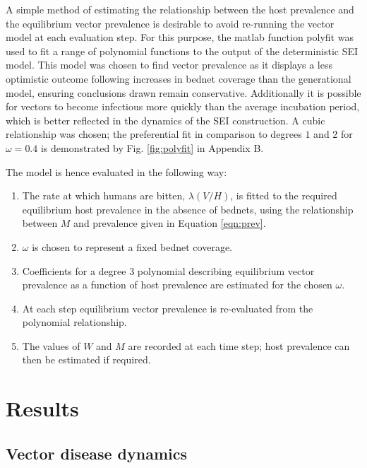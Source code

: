 \documentclass[5p,times]{elsarticle}
\begin{document}
A simple method of estimating the relationship between the host prevalence and the equilibrium vector prevalence is desirable to avoid re-running the vector model at each evaluation step. For this purpose, the matlab function polyfit was used to fit a range of polynomial functions to the output of the deterministic SEI model. This model was chosen to find vector prevalence as it displays a less optimistic outcome following increases in bednet coverage than the generational model, ensuring conclusions drawn remain conservative. Additionally it is possible for vectors to become infectious more quickly than the average incubation period, which is better reflected in the dynamics of the SEI construction. A cubic relationship was chosen; the preferential fit in comparison to degrees $1$ and $2$ for $\omega=0.4$ is demonstrated by Fig. \ref{fig:polyfit} in Appendix B.

The model is hence evaluated in the following way:
\begin{enumerate}
\item The rate at which humans are bitten, $\lambda(V/H)$, is fitted to the required equilibrium host prevalence in the absence of bednets, using the relationship between $M$ and prevalence given in Equation \ref{eqn:prev}.
\item $\omega$ is chosen to represent a fixed bednet coverage.
\item Coefficients for a degree $3$ polynomial describing equilibrium vector prevalence as a function of host prevalence are estimated for the chosen $\omega$.
\item At each step equilibrium vector prevalence is re-evaluated from the polynomial relationship. 
\item The values of $W$ and $M$ are recorded at each time step; host prevalence can then be estimated if required.
\end{enumerate}

\section{Results}

\subsection{Vector disease dynamics}
\end{document}
